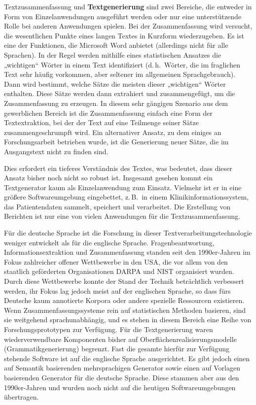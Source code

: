 \documentclass[]{../../metanetpaper}
\begin{document}
\begin{multicols}{2}
Textzusammenfassung und \textbf{Textgenerierung} sind zwei Bereiche, die entweder in Form von Einzelanwendungen ausgeführt werden oder nur eine unterstützende Rolle bei anderen Anwendungen spielen. Bei der Zusammenfassung wird versucht, die wesentlichen Punkte eines langen Textes in Kurzform wiederzugeben. Es ist eine der Funktionen, die Microsoft Word anbietet (allerdings nicht für alle Sprachen). In der Regel werden mithilfe eines statistischen Ansatzes die „wichtigen“ Wörter in einem Text identifiziert (d.\,h.~Wörter, die im fraglichen Text sehr häufig vorkommen, aber seltener im allgemeinen Sprachgebrauch). Dann wird bestimmt, welche Sätze die meisten dieser „wichtigen“ Wörter enthalten. Diese Sätze werden dann extrahiert und zusammengefügt, um die Zusammenfassung zu erzeugen. In diesem sehr gängigen Szenario aus dem gewerblichen Bereich ist die Zusammenfassung einfach eine Form der Textextraktion, bei der der Text auf eine Teilmenge seiner Sätze zusammengeschrumpft wird. Ein alternativer Ansatz, zu dem einiges an Forschungsarbeit betrieben wurde, ist die Generierung neuer Sätze, die im Ausgangstext nicht zu finden sind. 


Dies erfordert ein tieferes Verständnis des Textes, was bedeutet, dass dieser Ansatz bisher noch nicht so robust ist. Insgesamt gesehen kommt ein Textgenerator kaum als Einzelanwendung zum Einsatz. Vielmehr ist er in eine größere Softwareumgebung eingebettet, z.\,B.~in einem Klinikinformationssystem, das Patientendaten sammelt, speichert und verarbeitet. Die Erstellung von Berichten ist nur eine von vielen Anwendungen für die Textzusammenfassung. 

Für die deutsche Sprache ist die Forschung in dieser Textverarbeitungstechnologie weniger entwickelt als für die englische Sprache. Fragenbeantwortung, Informationsextraktion und Zusammenfassung standen seit den 1990er-Jahren im Fokus zahlreicher offener Wettbewerbe in den USA, die vor allem von den staatlich geförderten Organisationen DARPA und NIST organisiert wurden. Durch diese Wettbewerbe konnte der Stand der Technik beträchtlich verbessert werden, ihr Fokus lag jedoch meist auf der englischen Sprache, so dass fürs Deutsche kaum annotierte Korpora oder andere spezielle Ressourcen existieren. Wenn Zusammenfassungssysteme rein auf statistischen Methoden basieren, sind sie weitgehend sprachunabhängig, und es stehen in diesem Bereich eine Reihe von Forschungsprototypen zur Verfügung. Für die Textgenerierung waren wiederverwendbare Komponenten bisher auf Oberflächenrealisierungsmodelle (Grammatikgenerierung) begrenzt. Fast die gesamte hierfür zur Verfügung stehende Software ist auf die englische Sprache ausgerichtet. Es gibt jedoch einen auf Semantik basierenden mehrsprachigen Generator sowie einen auf Vorlagen basierenden Generator für die deutsche Sprache. Diese stammen aber aus den 1990er-Jahren und wurden noch nicht auf die heutigen Softwareumgebungen übertragen.


\end{multicols}
\end{document}
